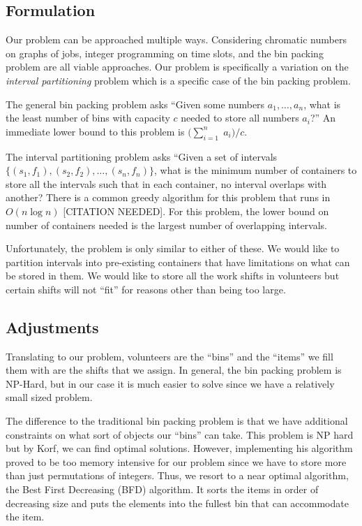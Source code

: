 \documentclass[11pt]{article}
\theoremstyle{definition}
\begin{document}
\begin{multicols}{2}
\section{Formulation}
Our problem can be approached multiple ways.
Considering chromatic numbers on graphs of jobs, integer programming on time slots, and the bin packing problem are all viable approaches.
Our problem is specifically a variation on the \textit{interval partitioning} problem which is a specific case of the bin packing problem.

The general bin packing problem asks ``Given some numbers $a_1, \ldots, a_n$, what is the least number of bins with capacity $c$ needed to store all numbers $a_i$?''
An immediate lower bound to this problem is $\big(\sum_{i = 1}^{n}\;a_i\big)/c$.

The interval partitioning problem asks ``Given a set of intervals $\{(s_1, f_1), (s_2, f_2), \ldots, (s_n, f_n)\}$, what is the minimum number of containers to store all the intervals such that in each container, no interval overlaps with another?
There is a common greedy algorithm for this problem that runs in $O(n\log n)$ [CITATION NEEDED].
For this problem, the lower bound on number of containers needed is the largest number of overlapping intervals.

Unfortunately, the problem is only similar to either of these.
We would like to partition intervals into pre-existing containers that have limitations on what can be stored in them.
We would like to store all the work shifts in volunteers but certain shifts will not ``fit'' for reasons other than being too large.

\subsection{Adjustments}
Translating to our problem, volunteers are the ``bins'' and the ``items'' we fill them with are the shifts that we assign.
In general, the bin packing problem is NP-Hard, but in our case it is much easier to solve since we have a relatively small sized problem.

The difference to the traditional bin packing problem is that we have additional constraints on what sort of objects our ``bins'' can take.
This problem is NP hard but by Korf, we can find optimal solutions.
However, implementing his algorithm proved to be too memory intensive for our problem since we have to store more than just permutations of integers.
Thus, we resort to a near optimal algorithm, the Best First Decreasing (BFD) algorithm.
It sorts the items in order of decreasing size and puts the elements into the fullest bin that can accommodate the item.


\end{multicols}
\end{document}
